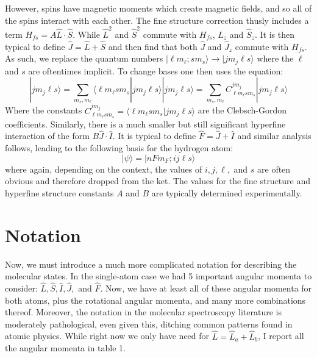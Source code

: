 \documentclass[prl, longbibliography]{revtex4-2}
\begin{document}
However, spins have magnetic moments which create magnetic fields, and so all of the spins interact with each other. 
The fine structure correction thusly includes a term $H_{fs}=A \hat{L}\cdot\hat{S}$. While $\hat{L}^2$ and $\hat{S}^2$ commute with $H_{fs}$, $\hat{L}_z$ and $\hat{S}_z$. It is then typical to define $\hat{J}=\hat{L}+\hat{S}$ and then find that both $\hat{J}$ and $\hat{J}_z$ commute with $H_{fs}$. 
As such, we replace the quantum numbers $|\ell m_\ell; s m_s\rangle\rightarrow|j m_j \ell s\rangle$ where the $\ell$ and $s$ are oftentimes implicit.
To change bases one then uses the equation:
\begin{equation}
|j m_j \ell s\rangle = \sum_{m_s, m_\ell} \langle \ell m_\ell s m_s | j m_j \ell s\rangle| j m_j \ell s\rangle = \sum_{m_s, m_\ell} C_{\ell m_\ell s m_s}^{j m_j}| j m_j \ell s\rangle
\end{equation}
Where the constants $C_{\ell m_\ell s m_s}^{j m_j}=\langle \ell m_\ell s m_s | j m_j \ell s\rangle$ are the Clebsch-Gordon coefficients. Similarly, there is a much smaller but still significant hyperfine interaction of the form $B \hat{J}\cdot\hat{I}$. It is typical to define $\hat{F} = \hat{J}+\hat{I}$ and similar analysis follows, leading to the following basis for the hydrogen atom:
\begin{equation}
|\psi\rangle = |n F m_F; ij\ell s\rangle
\end{equation}
where again, depending on the context, the values of $i,j,\ell,$ and $s$ are often obvious and therefore dropped from the ket. The values for the fine structure and hyperfine structure constants $A$ and $B$ are typically determined experimentally. 

\section{Notation}

Now, we must introduce a much more complicated notation for describing the molecular states. In the single-atom case we had 5 important angular momenta to consider: $\hat{L}, \hat{S}, \hat{I}, \hat{J},$ and $\hat{F}$. Now, we have at least all of these angular momenta for both atoms, plus the rotational angular momenta, and many more combinations thereof. Moreover, the notation in the molecular spectroscopy literature is moderately pathological, even given this, ditching common patterns found in atomic physics. While right now we only have need for $\hat{L}=\hat{L}_a+\hat{L}_b$, I report all the angular momenta in table 1. 
\end{document}
